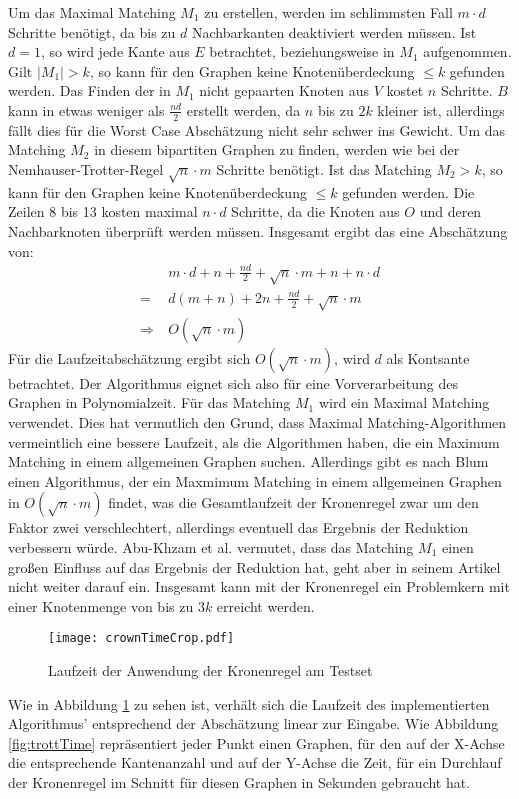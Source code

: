 Um das Maximal Matching $M_{1}$ zu erstellen, werden im schlimmsten Fall $m \cdot d$ Schritte benötigt, da bis zu $d$ Nachbarkanten deaktiviert werden müssen. Ist $d = 1$, so wird jede Kante aus $E$ betrachtet, beziehungsweise in $M_{1}$ aufgenommen. Gilt $|M_{1}| > k$, so kann für den Graphen keine Knotenüberdeckung  $ \leq k$ gefunden werden. Das Finden der in $M_{1}$ nicht gepaarten Knoten aus $V$ kostet $n$ Schritte. $B$ kann in etwas weniger als $\frac{nd}{2}$ erstellt werden, da $n$ bis zu $2k$ kleiner ist, allerdings fällt dies für die Worst Case Abschätzung nicht sehr schwer ins Gewicht. Um das Matching $M_{2}$ in diesem bipartiten Graphen zu finden, werden wie bei der Nemhauser-Trotter-Regel  $\sqrt{n} \cdot m$ Schritte benötigt. Ist das Matching $M_{2} > k$, so kann für den Graphen keine Knotenüberdeckung  $ \leq k$ gefunden werden. Die Zeilen 8 bis 13 kosten maximal $n \cdot d$ Schritte, da die Knoten aus $O$ und deren Nachbarknoten überprüft werden müssen. Insgesamt ergibt das eine Abschätzung von:
\begin{align}
&\ m \cdot d + n + \frac{nd}{2} + \sqrt{n} \cdot m + n  + n \cdot d \\
=&\ d (m+n) +2 n + \frac{nd}{2} + \sqrt{n} \cdot m \\
\Rightarrow &\ O(\sqrt{n} \cdot m)
\end{align}
Für die Laufzeitabschätzung ergibt sich $O(\sqrt{n} \cdot m)$, wird $d$ als Kontsante betrachtet. Der Algorithmus eignet sich also für eine Vorverarbeitung des Graphen in Polynomialzeit. Für das Matching $M_{1}$ wird ein Maximal Matching verwendet. Dies hat vermutlich den Grund, dass Maximal Matching-Algorithmen vermeintlich eine bessere Laufzeit, als die Algorithmen haben, die ein Maximum Matching in einem allgemeinen Graphen suchen. Allerdings gibt es nach Blum \cite{paper:8} einen Algorithmus, der ein Maxmimum Matching in einem allgemeinen Graphen in $O(\sqrt{n} \cdot m)$ findet, was die Gesamtlaufzeit der Kronenregel zwar um den Faktor zwei verschlechtert, allerdings eventuell das Ergebnis der Reduktion verbessern würde. Abu-Khzam et al. \cite{paper:7} vermutet, dass das Matching $M_{1}$ einen großen Einfluss auf das Ergebnis der Reduktion hat, geht aber in seinem Artikel nicht weiter darauf ein. Insgesamt kann mit der Kronenregel ein Problemkern mit einer Knotenmenge von bis zu $3k$ erreicht werden.
\begin{figure}[htb]
\centering
  	{\texttt{[image: crownTimeCrop.pdf]}}
	\caption{Laufzeit der Anwendung der Kronenregel am Testset\label{fig:crownTime}}
\centering
\end{figure}
Wie in Abbildung \ref{fig:crownTime} zu sehen ist, verhält sich die Laufzeit des implementierten Algorithmus' entsprechend der Abschätzung linear zur Eingabe. Wie Abbildung \ref{fig:trottTime} repräsentiert jeder Punkt einen Graphen, für den auf der X-Achse die entsprechende Kantenanzahl und auf der Y-Achse die Zeit, für ein Durchlauf der Kronenregel im Schnitt für diesen Graphen in Sekunden gebraucht hat.
